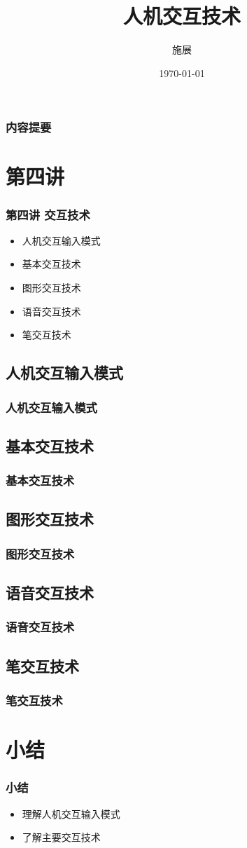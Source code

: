 \documentclass{beamer}
\title{人机交互技术}
\author{施展}
\institute{华中科技大学~武汉光电国家实验室}
\date{\today}
\begin{document}
\begin{frame}
	\titlepage
\end{frame}

\begin{frame}
	\frametitle{内容提要}
	\tableofcontents
\end{frame}

\section{第四讲}
\begin{frame}
	\frametitle{第四讲 交互技术}
	\begin{itemize}
		\item 人机交互输入模式
		\item 基本交互技术
		\item 图形交互技术
		\item 语音交互技术
		\item 笔交互技术
	\end{itemize}
\end{frame}

\subsection{人机交互输入模式}
\begin{frame}
	\frametitle{人机交互输入模式}

\end{frame}

\subsection{基本交互技术}
\begin{frame}
	\frametitle{基本交互技术}

\end{frame}

\subsection{图形交互技术}
\begin{frame}
	\frametitle{图形交互技术}

\end{frame}

\subsection{语音交互技术}
\begin{frame}
	\frametitle{语音交互技术}

\end{frame}

\subsection{笔交互技术}
\begin{frame}
	\frametitle{笔交互技术}

\end{frame}

\section{小结}
\begin{frame}
	\frametitle{小结}
	\begin{itemize}
		\item 理解人机交互输入模式
		\item 了解主要交互技术
	\end{itemize}
\end{frame}
 
\end{document}

